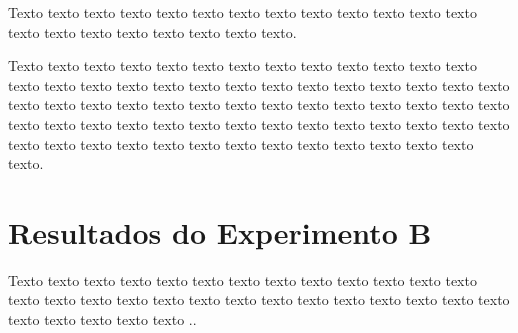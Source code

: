 \begin{figure}[h!]
	\captionsetup{width=16cm}
\end{figure}

Texto texto texto texto texto texto texto texto texto texto texto texto texto texto texto texto texto texto texto texto texto.

Texto texto texto texto texto texto texto texto texto texto texto texto texto texto texto texto texto texto texto texto texto texto texto texto texto texto texto texto texto texto texto texto texto texto texto texto texto texto texto texto texto texto texto texto texto texto texto texto texto texto texto texto texto texto texto texto texto texto texto texto texto texto texto texto texto texto texto texto texto.

\section{Resultados do Experimento B}
\label{sec:resultados-do-experimento-b}

Texto texto texto texto texto texto texto texto texto texto texto texto texto texto texto texto texto texto texto texto texto texto texto texto texto texto texto texto texto texto texto texto ..

\begin{table}[h!]	
	\captionsetup{width=11.3cm}%
\end{table}

